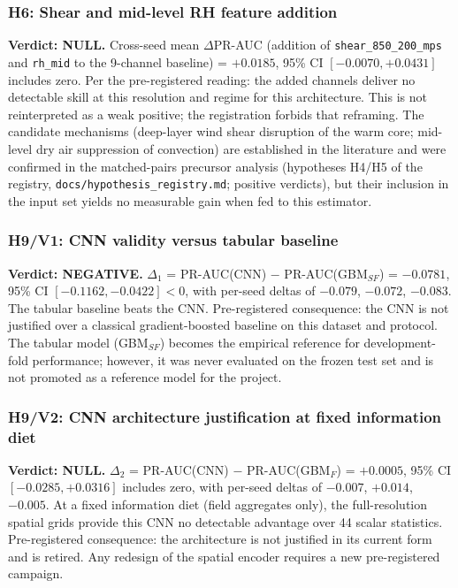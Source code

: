 \documentclass[11pt]{article}
\begin{document}
\subsubsection*{H6: Shear and mid-level RH feature addition}

\textbf{Verdict: NULL.} Cross-seed mean $\Delta$PR-AUC (addition of
\texttt{shear\_850\_200\_mps} and \texttt{rh\_mid} to the 9-channel baseline) =
$+0.0185$, 95\% CI $[-0.0070, +0.0431]$ includes zero. Per the pre-registered
reading: the added channels deliver no detectable skill at this resolution and
regime for this architecture. This is not reinterpreted as a weak positive; the
registration forbids that reframing. The candidate mechanisms (deep-layer wind
shear disruption of the warm core; mid-level dry air suppression of convection)
are established in the literature and were confirmed in the matched-pairs
precursor analysis (hypotheses H4/H5 of the registry,
\texttt{docs/hypothesis\_registry.md}; positive verdicts), but their inclusion
in the input set yields no measurable gain when fed to this estimator.

\subsubsection*{H9/V1: CNN validity versus tabular baseline}

\textbf{Verdict: NEGATIVE.} $\Delta_1$ = PR-AUC(CNN) $-$ PR-AUC(GBM$_{SF}$) =
$-0.0781$, 95\% CI $[-0.1162, -0.0422] < 0$, with per-seed deltas of $-0.079$,
$-0.072$, $-0.083$. The tabular baseline beats the CNN. Pre-registered
consequence: the CNN is not justified over a classical gradient-boosted
baseline on this dataset and protocol. The tabular model (GBM$_{SF}$) becomes
the empirical reference for development-fold performance; however, it was never
evaluated on the frozen test set and is not promoted as a reference model for
the project.

\subsubsection*{H9/V2: CNN architecture justification at fixed information diet}

\textbf{Verdict: NULL.} $\Delta_2$ = PR-AUC(CNN) $-$ PR-AUC(GBM$_F$) =
$+0.0005$, 95\% CI $[-0.0285, +0.0316]$ includes zero, with per-seed deltas of
$-0.007$, $+0.014$, $-0.005$. At a fixed information diet (field aggregates
only), the full-resolution spatial grids provide this CNN no detectable
advantage over 44 scalar statistics. Pre-registered consequence: the
architecture is not justified in its current form and is retired. Any redesign
of the spatial encoder requires a new pre-registered campaign.
\end{document}
